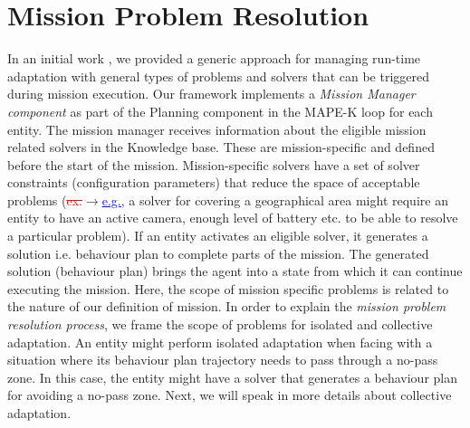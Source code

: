 \documentclass[journal]{IEEEtran}
\theoremstyle{definition}
\newcommand{\ra}{$\rightarrow$}
\newcommand{\chg}[2]{\textcolor{red}{\sout{#1}}{\ra}\textcolor{blue}{\uline{#2}}} %
\newcommand\darko[1]{\nb{Darko}{#1}}
\begin{document}
\section{Mission Problem Resolution}

 
 

 
 
 

 
In an initial work \cite{bozhinoski2016leveraging}, we provided a generic approach for managing run-time adaptation with general types of problems and solvers that can be triggered during mission execution.
Our framework implements a \textit{Mission Manager component} as part of the Planning component in the MAPE-K loop for each entity. 
 The mission manager receives information about the eligible mission related solvers in the Knowledge base. These are mission-specific and defined before the start of the mission. Mission-specific solvers have a set of solver constraints (configuration parameters) that reduce the space of acceptable problems (\chg{ex.}{e.g.,} a solver for covering a geographical area might require an entity to have an active camera, enough level of battery etc. to be  able to resolve a particular problem).  If an entity %
 activates an eligible solver, it generates a solution i.e. behaviour plan to complete parts of the mission.
 The generated solution (behaviour plan) brings the agent into a state from which it can continue executing the mission.
 Here, the scope of mission specific problems is related to the nature of our definition of mission. In order to explain the \textit{mission problem resolution process}, we frame the scope of problems for isolated and collective adaptation.
 An entity might perform isolated adaptation when facing with a situation where its behaviour plan trajectory needs to pass through a no-pass zone. In this case, the entity might have a solver that generates a behaviour plan for avoiding a no-pass zone. Next, we will speak in more details about collective adaptation.
\end{document}
